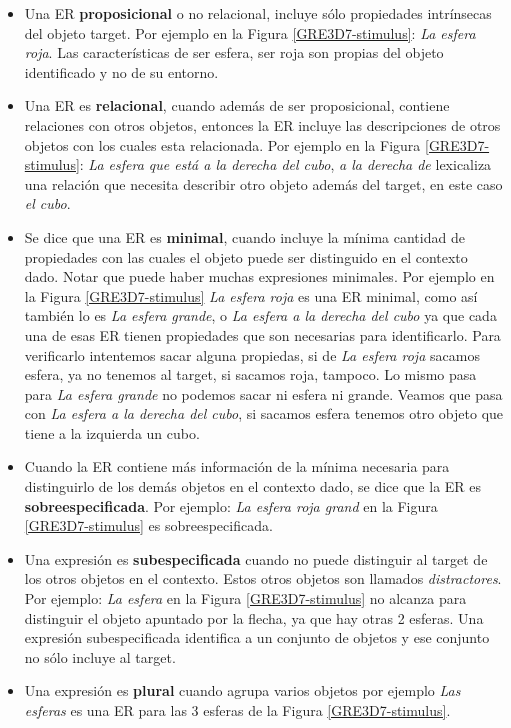 \begin{itemize}
\item Una ER {\bf proposicional} o no relacional, incluye s\'olo propiedades intr\'insecas del objeto target. Por ejemplo en la Figura \ref{GRE3D7-stimulus}: {\it La esfera roja}. Las caracter\'isticas de ser esfera, ser roja son propias del objeto identificado y no de su entorno.

\item Una ER es {\bf relacional}, cuando adem\'as de ser proposicional, contiene relaciones con otros objetos, entonces la ER incluye las descripciones de otros objetos con los cuales esta relacionada. Por ejemplo en la Figura \ref{GRE3D7-stimulus}: {\it La esfera que est\'a a la derecha del cubo}, {\it a la derecha de} lexicaliza una relaci\'on que necesita describir otro objeto adem\'as del target, en este caso {\it el cubo}.

\item \label{sec:minimales} Se dice que una ER es {\bf minimal}, cuando incluye la m\'inima cantidad de propiedades con las cuales el objeto puede ser distinguido en el contexto dado. Notar que puede haber muchas expresiones minimales. Por ejemplo en la Figura \ref{GRE3D7-stimulus} {\it La esfera roja} es una ER minimal, como as\'i tambi\'en lo es {\it La esfera grande}, o {\it La esfera a la derecha del cubo} ya que cada una de esas ER tienen propiedades que son necesarias para identificarlo. Para verificarlo intentemos sacar alguna propiedas, si de {\it La esfera roja} sacamos esfera, ya no tenemos al target, si sacamos roja, tampoco. Lo mismo pasa para {\it La esfera grande} no podemos sacar ni esfera ni grande. Veamos que pasa con {\it La esfera a la derecha del cubo}, si sacamos esfera tenemos otro objeto que tiene a la izquierda un cubo.

\item Cuando la ER contiene m\'as informaci\'on de la m\'inima necesaria para distinguirlo de los dem\'as objetos en el contexto dado, se dice que la ER es {\bf sobreespecificada}. Por ejemplo: {\it La esfera roja grand} en la Figura \ref{GRE3D7-stimulus} es sobreespecificada.

\item Una expresi\'on es {\bf subespecificada} cuando no puede distinguir al target de los otros objetos en el contexto. Estos otros objetos son llamados {\it distractores}. Por ejemplo: {\it La esfera} en la Figura \ref{GRE3D7-stimulus} no alcanza para distinguir el objeto apuntado por la flecha, ya que hay otras 2 esferas. Una expresi\'on subespecificada identifica a un conjunto de objetos y ese conjunto no s\'olo incluye al target.

\item Una expresi\'on es {\bf plural} cuando agrupa varios objetos por ejemplo {\it Las esferas} es una ER para las 3 esferas de la Figura \ref{GRE3D7-stimulus}. 
\end{itemize}

